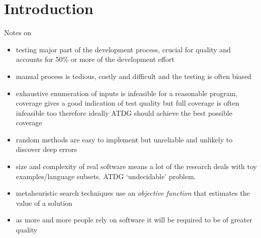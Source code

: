 \documentclass[a4paper,11pt,titlepage]{report}
\begin{document}
\tableofcontents

\chapter{Introduction}
Notes on \cite{mcminn2004search}
\begin{itemize}
\item testing major part of the development process, crucial for quality and accounts for 50\% or more of the development effort
\item manual process is tedious, costly and difficult and the testing is often biased
\item exhaustive enumeration of inputs is infeasible for a reasonable program, coverage gives a good indication of test quality but full coverage is often infeasible too therefore ideally ATDG should achieve the best possible coverage
\item random methods are easy to implement but unreliable and unlikely to discover deep errors
\item size and complexity of real software means a lot of the research deals with toy examples/language subsets. ATDG `undecidable' problem.
\item metaheuristic search techniques use an \emph{objective function} that estimates the value of a solution
\item as more and more people rely on software it will be required to be of greater quality

\end{itemize}

\end{document}
